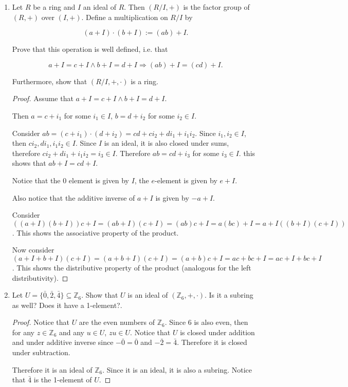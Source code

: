 \documentclass[12pt]{article}
\begin{document}
\begin{enumerate}
\begin{proof}
     Therefore $\displaystyle\bigcap \limits_{j \in J} I_j$ has all the properties of an ideal of $R$.
    \end{proof}
    
    \item Let $R$ be a ring and $I$ an ideal of $R$. Then $(R/I,+)$ is the factor group of $(R,+)$ over $(I,+)$. Define a multiplication on $R/I$ by 
    
    $$ (a+I) \cdot (b+I) := (ab)+I.$$
    
    Prove that this operation is well defined, i.e. that 
    
    $$ a + I = c+ I \wedge b+I = d+ I \Rightarrow (ab)+ I = (cd)+I.$$
    
    Furthermore, show that $(R/I,+,\cdot)$ is a ring.
    
    \begin{proof}
     Assume that $a + I = c+ I \wedge b+I = d+ I$.
     
     Then $a = c+ i_1$ for some $i_1 \in I$, $b = d+i_2$ for some $i_2 \in I$.
     
     Consider $ab = (c+ i_1) \cdot (d + i_2) = cd +c i_2 + d i_1 + i_1 i_2$. Since $i_1, i_2 \in I$, then $c i_2 , d i_1 , i_1 i_2 \in I$. Since $I$ is an ideal, it is also closed under sums, therefore $c i_2 + d i_1 + i_1 i_2 = i_3 \in I$. Therefore $ab = cd + i_3$ for some $i_3 \in I$. this shows that $ab + I = cd + I $. 
     
     Notice that the $0$ element is given by $I$, the $e$-element is given by $e + I$.
     
     Also notice that the additive inverse of $a+I$ is given by $-a+ I$.
     
     Consider $((a+I) (b+I)) c+ I = (ab +I) (c+I) = (ab)c + I = a (bc) + I = a +I ((b+I) (c+I) )$. This shows the associative property of the product.
     
     Now consider $(a+ I + b+ I) (c+I) = (a+b+ I) (c+ I) = (a+b)c + I = ac + bc + I = ac +I + bc + I$. This shows the distributive property of the product (analogous for the left distributivity). 
     
     
     
    \end{proof}
    
    \item Let $U = \{ \bar 0, \bar 2, \bar 4 \} \subseteq \mathbb{Z}_6$. Show that $U$ is an ideal of $(\mathbb{Z}_6,+, \cdot)$. Is it a subring as well? Does it have a 1-element?.
    
    \begin{proof}
    Notice that $U$ are the even numbers of $\mathbb{Z}_6$. Since 6 is also even, then for any $z \in \mathbb{Z}_6$ and any $u \in U$, $zu \in U$. Notice that $U$ is closed under addition and under additive inverse since $-\bar 0 = \bar 0$ and $- \bar 2 = \bar 4$. Therefore it is closed under subtraction. 
    
    Therefore it is an ideal of $\mathbb{Z}_6$. Since it is an ideal, it is also a subring. Notice that $\bar 4$ is the 1-element of $U$.
    \end{proof}
    
    \end{enumerate}
    
    
\end{document}
